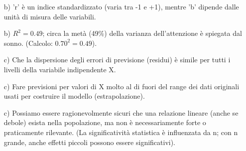 \documentclass[12pt, a4paper]{article}
\newcommand{\rsq}{R^2}
\begin{document}
\begin{enumerate}
\item[b)]  'r' è un indice standardizzato (varia tra -1 e +1), mentre 'b' dipende dalle unità di misura delle variabili.
\item[b)]  $\rsq = 0.49$; circa la metà (49\%) della varianza dell'attenzione è spiegata dal sonno. (Calcolo: $0.70^2 = 0.49$).
\item[c)]  Che la dispersione degli errori di previsione (residui) è simile per tutti i livelli della variabile indipendente X.
\item[c)]  Fare previsioni per valori di X molto al di fuori del range dei dati originali usati per costruire il modello (estrapolazione).
\item[c)]  Possiamo essere ragionevolmente sicuri che una relazione lineare (anche se debole) esista nella popolazione, ma non è necessariamente forte o praticamente rilevante. (La significatività statistica è influenzata da n; con n grande, anche effetti piccoli possono essere significativi).

\end{enumerate}
\end{document}
